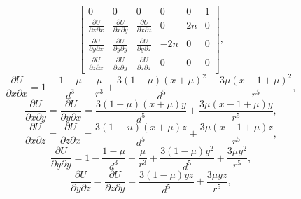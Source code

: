 \begin{equation}
\begin{bmatrix}
                            0                                       &   0                                       &   0                                       &   0   &   0   &   1   \\
                            \frac{\partial U}{\partial x\partial x} &   \frac{\partial U}{\partial x\partial y} &   \frac{\partial U}{\partial x\partial z} &   0   &   2n  &   0   \\
                            \frac{\partial U}{\partial y\partial x} &   \frac{\partial U}{\partial y\partial y} &   \frac{\partial U}{\partial y\partial z} &   -2n &   0   &   0   \\
                            \frac{\partial U}{\partial z\partial x} &   \frac{\partial U}{\partial z\partial y} &   \frac{\partial U}{\partial z\partial z} &   0   &   0   &   0   \end{bmatrix},
                            \label{eq:variationalJacobian}
\end{equation}
\vspace{1mm}
\begin{equation}
    \frac{\partial U}{\partial x\partial x}=1-\frac{1-\mu}{d^{3}}-\frac{\mu}{r^{3}}+\frac{3(1-\mu)(x+\mu)^{2}}{d^{5}}+\frac{3\mu(x-1+\mu)^{2}}{r^{5}},
    \label{eq:partialUpartialxx}
\end{equation}
\vspace{1mm}
\begin{equation}
    \frac{\partial U}{\partial x\partial y}=\frac{\partial U}{\partial y\partial x}=\frac{3(1-\mu)(x+\mu)y}{d^{5}}+\frac{3\mu(x-1+\mu)y}{r^{5}},
    \label{eq:partialUpartialxy}
\end{equation}
\vspace{1mm}
\begin{equation}
    \frac{\partial U}{\partial x\partial z}=\frac{\partial U}{\partial z\partial x}=\frac{3(1-\,u)(x+\mu)z}{d^{5}}+\frac{3\mu(x-1+\mu)z}{r^{5}},
    \label{eq:partialUpartialxz}
\end{equation}
\vspace{1mm}
\begin{equation}
    \frac{\partial U}{\partial y\partial y}=1-\frac{1-\mu}{d^{3}}-\frac{\mu}{r^{3}}+\frac{3(1-\mu)y^{2}}{d^{5}}+\frac{3\mu y^{2}}{r^{5}},
    \label{eq:partialUpartialyy}
\end{equation}
\vspace{1mm}
\begin{equation}
    \frac{\partial U}{\partial y\partial z}=\frac{\partial U}{\partial z\partial y}=\frac{3(1-\mu)yz}{d^{5}}+\frac{3\mu yz}{r^{5}},
    \label{eq:partialUpartialyz}
\end{equation}
